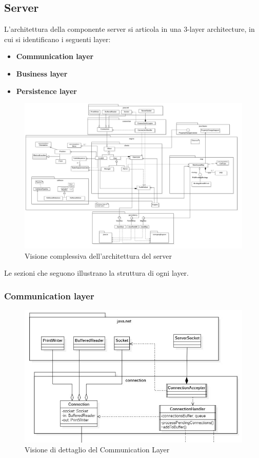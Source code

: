 \subsection{Server}

L'architettura della componente server si articola in una 3-layer architecture, in cui si identificano i seguenti layer:
\begin{itemize}
	\item \textbf{Communication layer}
	\item \textbf{Business layer}
	\item \textbf{Persistence layer}
\end{itemize}

\begin{figure}[H]
	\centering
	\includegraphics[scale=0.22]{res/diagrams/server/server_complessivo_minimal.jpg}
	\caption{Visione complessiva dell'architettura del server}
\end{figure}

Le sezioni che seguono illustrano la struttura di ogni layer.

\subsubsection{Communication layer}
\label{communication-layer}

\begin{figure}[H]
	\centering
	\includegraphics[scale=0.55]{res/diagrams/server/server_communication.jpg}
	\caption{Visione di dettaglio del Communication Layer}
\end{figure}


